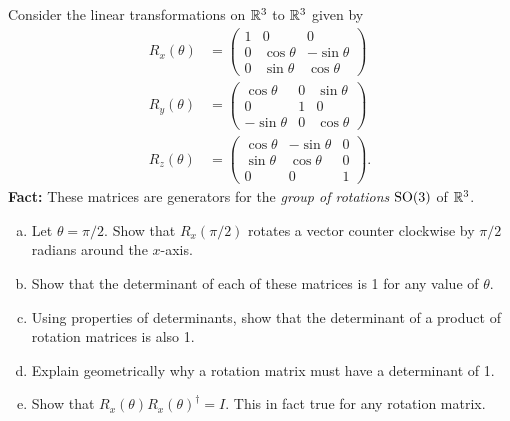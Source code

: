 \documentclass[12pt]{article} %
\begin{document}
\begin{problem}
Consider the linear transformations on $\mathbb{R}^3$ to $\mathbb{R}^3$ given by
\begin{align*}
    R_x(\theta) &= \begin{pmatrix} 1 & 0 & 0 \\ 0 & \cos\theta & -\sin \theta \\ 0 & \sin\theta & \cos \theta \end{pmatrix}\\
    R_y(\theta) &= \begin{pmatrix} \cos \theta & 0 & \sin \theta \\ 0 & 1 & 0 \\ -\sin \theta & 0 & \cos \theta \end{pmatrix}\\
    R_z(\theta) &= \begin{pmatrix} \cos \theta & -\sin \theta & 0 \\ \sin \theta & \cos \theta  & 0 \\ 0 & 0 & 1 \end{pmatrix}.
\end{align*}
\textbf{Fact:} These matrices are generators for the \emph{group of rotations} $\mathrm{SO}(3)$ of $\mathbb{R}^3$.
\begin{enumerate}[(a)]
    \item Let $\theta = \pi/2$. Show that $R_x(\pi/2)$ rotates a vector counter clockwise by $\pi/2$ radians around the $x$-axis.
    \item Show that the determinant of each of these matrices is 1 for any value of $\theta$.
    \item Using properties of determinants, show that the determinant of a product of rotation matrices is also 1.
    \item Explain geometrically why a rotation matrix must have a determinant of 1.
    \item Show that $R_x(\theta)R_x(\theta)^\dagger = I$. This in fact true for any rotation matrix.
\end{enumerate}
\end{problem}
\end{document}
